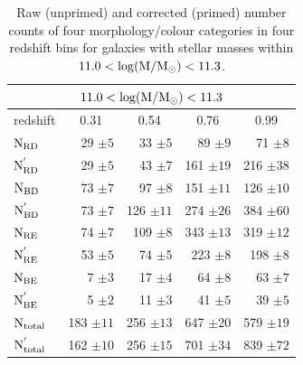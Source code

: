 \documentclass[useAMS,usenatbib]{mn2e}
\begin{document}
\begin{table}
\begin{tabular}{lrrrr}
\hline
\hline
\multicolumn{5}{c}{$11.0<\rm \log(M/M_{\odot})<11.3$}\\
\hline
\hline
\multicolumn{1}{l}{redshift} & \multicolumn{1}{c}{0.31} & \multicolumn{1}{c}{0.54} & \multicolumn{1}{c}{0.76} & \multicolumn{1}{c}{0.99} \\
\hline
$\rm N_{RD}$        & 29 $\pm 5$    & 33 $\pm 5$    & 89 $\pm 9$    & 71 $\pm 8$     \\
$\rm N^{'}_{RD}$    & 29 $\pm 5$    & 43 $\pm 7$    & 161 $\pm 19$  & 216 $\pm 38$    \\
$\rm N_{BD}$        & 73 $\pm 7$    & 97 $\pm 8$    & 151 $\pm 11$  & 126 $\pm 10$   \\
$\rm N^{'}_{BD}$    & 73 $\pm 7$    & 126 $\pm 11$  & 274 $\pm 26$  & 384 $\pm 60$ \\
$\rm N_{RE}$        & 74 $\pm 7$    & 109 $\pm 8$   & 343 $\pm 13$  & 319 $\pm 12$   \\
$\rm N^{'}_{RE}$    & 53 $\pm 5$    & 74 $\pm 5$    & 223 $\pm 8$   & 198 $\pm 8$    \\
$\rm N_{BE}$        & 7  $\pm 3$    & 17 $\pm 4$    & 64 $\pm 8$    & 63 $\pm 7$   \\
$\rm N^{'}_{BE}$    & 5  $\pm 2$    & 11 $\pm 3$    & 41 $\pm 5$    & 39 $\pm 5$    \\
\hline
$\rm N_{total}$     & 183 $\pm 11$    & 256 $\pm 13$   & 647 $\pm 20$  & 579 $\pm 19$   \\
$\rm N^{'}_{total}$ & 162 $\pm 10$    & 256 $\pm 15$   & 701 $\pm 34$  & 839 $\pm 72$   \\
\hline
\hline
\end{tabular}
\caption{Raw (unprimed) and corrected (primed) number counts of four morphology/colour categories in four redshift bins for galaxies with stellar masses within $\rm 11.0< \log(M/M_{\odot})<11.3$. }
\label{tab:counts_table}
\end{table}
\end{document}
